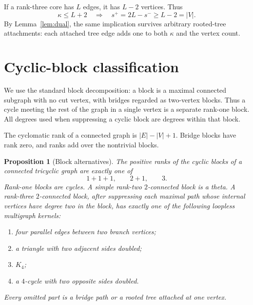 \documentclass[11pt]{article}
\newtheorem{proposition}[theorem]{Proposition}
\theoremstyle{remark}
\newcommand{\splus}{s^+}
\newcommand{\sminus}{s^-}
\begin{document}
If a rank-three core has $L$ edges, it has $L-2$ vertices.  Thus
\begin{equation}\label{eq:threshold}
 \kappa\leq L+2\quad\Longrightarrow\quad
 \splus=2L-\sminus\geq L-2=|V|.
\end{equation}
By Lemma~\ref{lem:dual}, the same implication survives arbitrary rooted-tree
attachments: each attached tree edge adds one to both $\kappa$ and the vertex
count.

\section{Cyclic-block classification}

We use the standard block decomposition: a block is a maximal connected
subgraph with no cut vertex, with bridges regarded as two-vertex blocks. Thus
a cycle meeting the rest of the graph in a single vertex is a separate
rank-one block. All degrees used when suppressing a cyclic block are degrees
within that block.

The cyclomatic rank of a connected graph is $|E|-|V|+1$.  Bridge blocks have
rank zero, and ranks add over the nontrivial blocks.

\begin{proposition}[Block alternatives]\label{prop:blocks}
The positive ranks of the cyclic blocks of a connected tricyclic graph are
exactly one of
\[
 1+1+1,\qquad 2+1,\qquad 3.
\]
Rank-one blocks are cycles.  A simple rank-two $2$-connected block is a theta.
A rank-three $2$-connected block, after suppressing each maximal path whose
internal vertices have degree two in the block, has exactly one of the
following loopless multigraph kernels:
\begin{enumerate}
 \item four parallel edges between two branch vertices;
 \item a triangle with two adjacent sides doubled;
 \item $K_4$;
 \item a $4$-cycle with two opposite sides doubled.
\end{enumerate}
Every omitted part is a bridge path or a rooted tree attached at one vertex.
\end{proposition}
\end{document}
